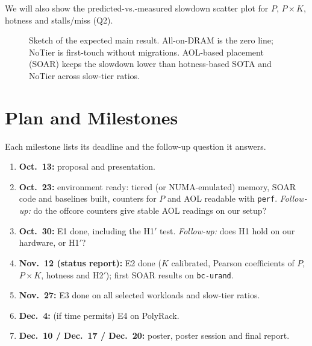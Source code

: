 \documentclass[conference]{IEEEtran}
\begin{document}
We will also show the
predicted-vs.-measured slowdown scatter plot for $P$, $P\times K$, hotness
and stalls/miss (Q2).

\begin{figure}[t]
\centering
{}
\caption{Sketch of the expected main result. All-on-DRAM is the zero line;
NoTier is first-touch without migrations. AOL-based placement (SOAR) keeps the
slowdown lower than hotness-based SOTA and NoTier across slow-tier ratios.}
\label{fig:expected}
\end{figure}

\section{Plan and Milestones}
\label{sec:milestones}
Each milestone lists its deadline and the follow-up question it answers.
\begin{enumerate}
  \item \textbf{Oct.~13:} proposal and presentation.
  \item \textbf{Oct.~23:} environment ready: tiered (or NUMA-emulated)
        memory, SOAR code and baselines built, counters for $P$ and AOL
        readable with \texttt{perf}.
        \emph{Follow-up:} do the offcore counters give stable AOL readings on our setup?
  \item \textbf{Oct.~30:} E1 done, including the H1$'$ test.
        \emph{Follow-up:} does H1 hold on our hardware, or H1$'$?
  \item \textbf{Nov.~12 (status report):} E2 done ($K$ calibrated, Pearson
        coefficients of $P$, $P\times K$, hotness and H2$'$); first SOAR
        results on \texttt{bc-urand}.
  \item \textbf{Nov.~27:} E3 done on all selected workloads and slow-tier
        ratios.
  \item \textbf{Dec.~4:} (if time permits) E4 on PolyRack.
  \item \textbf{Dec.~10 / Dec.~17 / Dec.~20:} poster, poster session and
        final report.
\end{enumerate}
\end{document}
